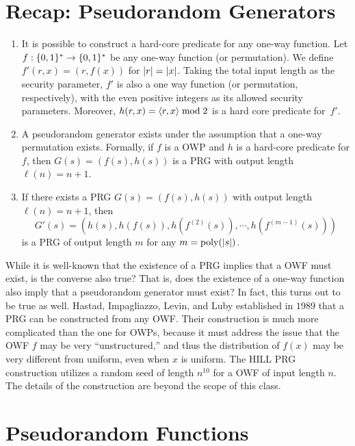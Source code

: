 \documentclass[11pt]{article}
\begin{document}
\thispagestyle{fancy}           %


\section{Recap: Pseudorandom Generators}
\label{sec:recap:-pseud-gener}

\begin{enumerate}
\item It is possible to construct a hard-core predicate for any
  one-way function.
  Let $f: \{0,1\}^{*} \rightarrow \{0,1\}^{*}$ be any one-way function (or permutation).
  We define $f'(r,x) = (r,f(x))$ for $\lvert r\rvert = \lvert x\rvert$.
  Taking the total input length as the security parameter, $f'$ is also a one way function (or permutation, respectively), with the even positive integers as its allowed security parameters.
  Moreover, $h(r,x) = \langle r,x\rangle \bmod 2$ is a hard core predicate for~$f'$.
\item A pseudorandom generator exists under the assumption that a
  one-way permutation exists.  Formally, if $f$ is a OWP and $h$ is a
  hard-core predicate for $f$, then $G(s) = (f(s), h(s))$ is a PRG
  with output length $\ell(n) = n+1$.
\item If there exists a PRG $G(s) = (f(s), h(s))$ with output length
  $\ell(n) = n+1$, then
  \[G'(s) = (h(s), h(f(s)), h(f^{(2)}(s)), \cdots ,h(f^{(m-1)}(s))) \]
  is a PRG of output length $m$ for any $m = \operatorname{poly}(\lvert s\rvert)$.
\end{enumerate}

While it is well-known that the existence of a PRG implies that a OWF
must exist, is the converse also true?  That is, does the existence of
a one-way function also imply that a pseudorandom generator must
exist?  In fact, this turns out to be true as well.  Hastad,
Impagliazzo, Levin, and Luby established in $1989$ that a PRG can be
constructed from any OWF.  Their construction is much more complicated
than the one for OWPs, because it must address the issue that the OWF
$f$ may be very ``unstructured,'' and thus the distribution of $f(x)$
may be very different from uniform, even when $x$ is uniform.  The
HILL PRG construction utilizes a random seed of length $n^{10}$ for a
OWF of input length $n$.  The details of the construction are beyond
the scope of this class.

\section{Pseudorandom Functions}
\label{sec:pseud-funct}
\end{document}
